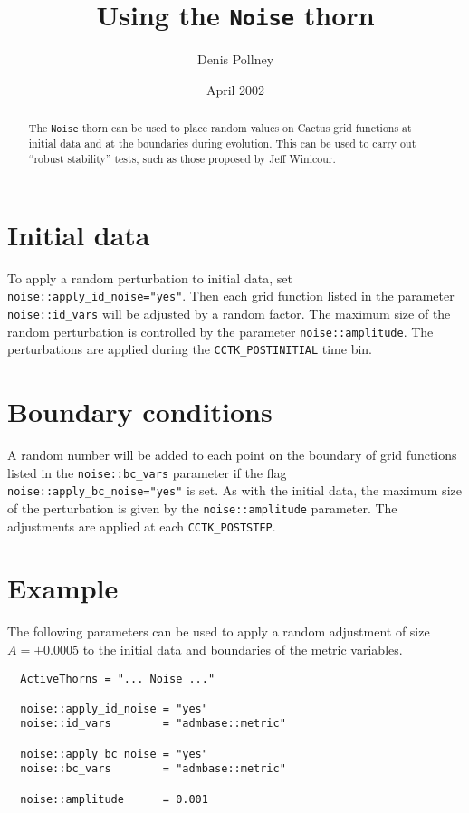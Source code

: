 \documentclass{article}
\begin{document}
\title{Using the \texttt{Noise} thorn}
\author{Denis Pollney}
\date{April 2002}

\maketitle


\begin{abstract}
The \texttt{Noise} thorn can be used to place random values on
Cactus grid functions at initial data and at the boundaries during
evolution. This can be used to carry out ``robust stability'' tests,
such as those proposed by Jeff Winicour.\\
\end{abstract}

\section{Initial data}

To apply a random perturbation to initial data, set
\texttt{noise::apply\_id\_noise="yes"}. Then each grid function
listed in the parameter \texttt{noise::id\_vars} will be adjusted
by a random factor. The maximum size of the random perturbation is
controlled by the parameter \texttt{noise::amplitude}. The
perturbations are applied during the \texttt{CCTK\_POSTINITIAL}
time bin.

\section{Boundary conditions}

A random number will be added to each point on the boundary of grid
functions listed in the \texttt{noise::bc\_vars} parameter if the
flag \texttt{noise::apply\_bc\_noise="yes"} is set. As with the
initial data, the maximum size of the perturbation is given by the
\texttt{noise::amplitude} parameter. The adjustments are applied at
each \texttt{CCTK\_POSTSTEP}.

\section{Example}

The following parameters can be used to apply a random adjustment 
of size $A=\pm0.0005$ to the initial data and boundaries of the metric
variables.
\begin{verbatim}
  ActiveThorns = "... Noise ..."

  noise::apply_id_noise = "yes"
  noise::id_vars        = "admbase::metric"

  noise::apply_bc_noise = "yes"
  noise::bc_vars        = "admbase::metric"

  noise::amplitude      = 0.001
\end{verbatim}
\end{document}
